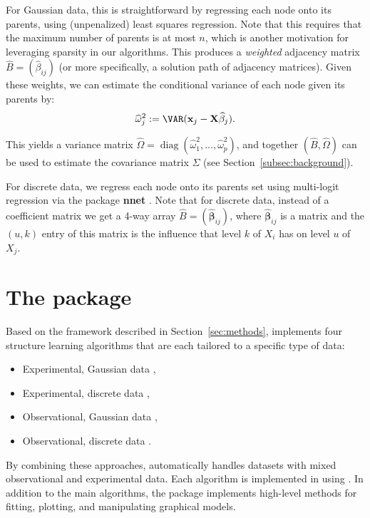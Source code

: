 \documentclass[article]{jss}
\DeclareMathOperator*{\diag}{diag}
\newcommand{\trueCov}{\Sigma}
\newcommand{\dagmat}{B}
\newcommand{\dagcomp}{\beta}
\newcommand{\dagest}{\widehat{\dagmat}}
\newcommand{\dagcompest}{\widehat{\dagcomp}}
\newcommand{\varcomp}{\omega}
\newcommand{\varest}{\widehat{\Omega}}
\newcommand{\varcompest}{\widehat{\varcomp}}
\newcommand{\samplemat}{\mathbf{X}}
\newcommand{\samplematcol}{\mathbf{x}}
\renewcommand{\|}{\,|\,}
\begin{document}
For Gaussian data, this is straightforward by regressing each node onto its parents, using (unpenalized) least squares regression. Note that this requires that the maximum number of parents is at most $n$, which is another motivation for leveraging sparsity in our algorithms. This produces a \emph{weighted} adjacency matrix $\dagest=(\dagcompest_{ij})$ (or more specifically, a solution path of adjacency matrices). Given these weights, we can estimate the conditional variance of each node given its parents by:
\begin{align*}
\varcompest_{j}^{2}
:= \VAR(\samplematcol_{j} - \samplemat\dagcompest_{j}).
\end{align*}

\noindent
This yields a variance matrix $\varest=\diag(\varcompest_{1}^{2},\ldots,\varcompest_{p}^{2})$, and together $(\dagest,\varest)$ can be used to estimate the covariance matrix $\trueCov$ (see Section~\ref{subsec:background}).

For discrete data, we regress each node onto its parents set using multi-logit regression via the  package \textbf{nnet} \citep{venables2002}.  
Note that for discrete data, instead of a coefficient matrix we get a 4-way array $\widehat{B} = (\widehat{\boldsymbol{\beta}}_{i j})$, where $\widehat{\boldsymbol{\beta}}_{ij}$ is a matrix and the $(u,k)$ entry of this matrix is the influence that level $k$ of $X_i$ has on level $u$ of $X_j$.

\section[The sparsebn package]{The  package}
\label{sec:sparsebn}

Based on the framework described in Section~\ref{sec:methods},  implements four structure learning algorithms that are each tailored to a specific type of data:
\begin{itemize}
\item Experimental, Gaussian data \citep{zhang2016},
\item Experimental, discrete data \citep{gu2018},
\item Observational, Gaussian data \citep{aragam2015},
\item Observational, discrete data \citep{gu2018}.
\end{itemize}

\noindent
By combining these approaches,  automatically handles datasets with mixed observational and experimental data. Each algorithm is implemented in  using  \citep{eddelbuettel2011,eddelbuettel2013}. In addition to the main algorithms, the package implements high-level methods for fitting, plotting, and manipulating graphical models. 
\end{document}
